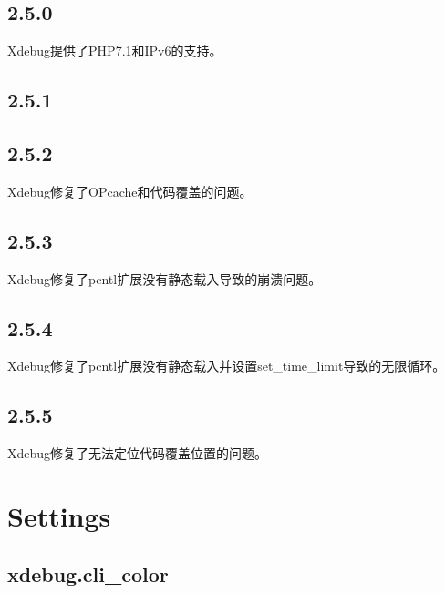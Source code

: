 \subsection{2.5.0}

Xdebug提供了PHP7.1和IPv6的支持。

\subsection{2.5.1}


\subsection{2.5.2}


Xdebug修复了OPcache和代码覆盖的问题。

\subsection{2.5.3}


Xdebug修复了pcntl扩展没有静态载入导致的崩溃问题。


\subsection{2.5.4}


\begin{compactitem}
\item Xdebug修复了pcntl扩展没有静态载入并设置set\_time\_limit导致的无限循环。
\end{compactitem}


\subsection{2.5.5}

\begin{compactitem}
\item Xdebug修复了无法定位代码覆盖位置的问题。
\end{compactitem}



\section{Settings}


\subsection{xdebug.cli\_color}



